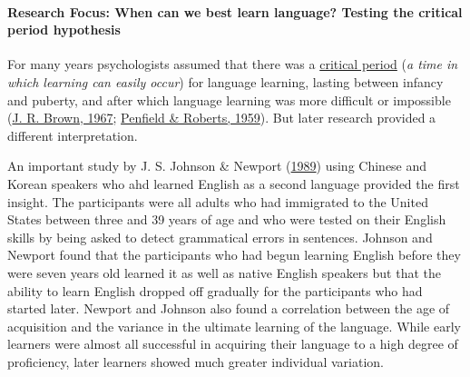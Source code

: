 \documentclass[
]{krantz}
\begin{document}
\hypertarget{research-focus-when-can-we-best-learn-language-testing-the-critical-period-hypothesis}{%
\paragraph*{Research Focus: When can we best learn language? Testing the critical period hypothesis}\label{research-focus-when-can-we-best-learn-language-testing-the-critical-period-hypothesis}}

For many years psychologists assumed that there was a \protect\hyperlink{critical-period}{critical period} (\emph{a time in which learning can easily occur}) for language learning, lasting between infancy and puberty, and after which language learning was more difficult or impossible (\protect\hyperlink{ref-brown1967}{J. R. Brown, 1967}; \protect\hyperlink{ref-Penfield1959}{Penfield \& Roberts, 1959}). But later research provided a different interpretation.

An important study by J. S. Johnson \& Newport (\protect\hyperlink{ref-Johnson1989}{1989}) using Chinese and Korean speakers who ahd learned English as a second language provided the first insight. The participants were all adults who had immigrated to the United States between three and 39 years of age and who were tested on their English skills by being asked to detect grammatical errors in sentences. Johnson and Newport found that the participants who had begun learning English before they were seven years old learned it as well as native English speakers but that the ability to learn English dropped off gradually for the participants who had started later. Newport and Johnson also found a correlation between the age of acquisition and the variance in the ultimate learning of the language. While early learners were almost all successful in acquiring their language to a high degree of proficiency, later learners showed much greater individual variation.
\end{document}
